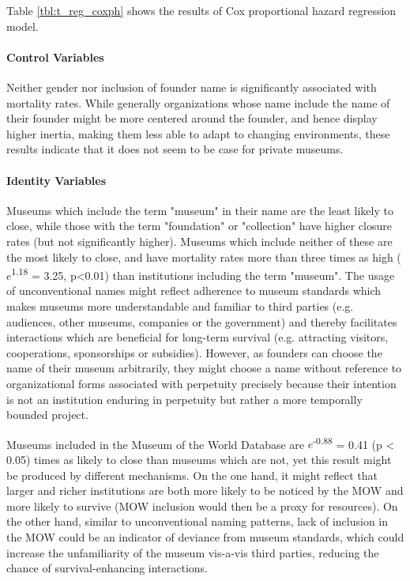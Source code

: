 \documentclass[12pt]{article}
\begin{document}
Table \ref{tbl:t_reg_coxph} shows the results of Cox proportional hazard regression model.


\paragraph*{Control Variables}


Neither gender nor inclusion of founder name is significantly associated with mortality rates.
While generally organizations whose name include the name of their founder might be more centered around the founder, and hence display higher inertia, making them less able to adapt to changing environments, these results indicate that it does not seem to be case for private museums.


\paragraph*{Identity Variables}


Museums which include the term "museum" in their name are the least likely to close, while those with the term "foundation" or "collection" have higher closure rates (but not significantly higher).
Museums which include neither of these are the most likely to close, and have mortality rates more than three times as high (\(e\)\textsuperscript{1.18} = 3.25, p<0.01) than institutions including the term "museum".
The usage of unconventional names might reflect adherence to museum standards which makes museums more understandable and familiar to third parties (e.g. audiences, other museums, companies or the government) and thereby facilitates interactions which are beneficial for long-term survival (e.g. attracting visitors, cooperations, sponsorships or subsidies).
However, as founders can choose the name of their museum arbitrarily, they might choose a name without reference to organizational forms associated with perpetuity precisely because their intention is not an institution enduring in perpetuity but rather a more temporally bounded project.


Museums included in the Museum of the World Database are \(e\)\textsuperscript{-0.88} = 0.41 (p < 0.05) times as likely to close than museums which are not, yet this result might be produced by different mechanisms.
On the one hand, it might reflect that larger and richer institutions are both more likely to be noticed by the MOW and more likely to survive (MOW inclusion would then be a proxy for resources).
On the other hand, similar to unconventional naming patterns, lack of inclusion in the MOW could be an indicator of deviance from museum standards, which could increase the unfamiliarity of the museum vis-a-vis third parties, reducing the chance of survival-enhancing interactions.
\end{document}
